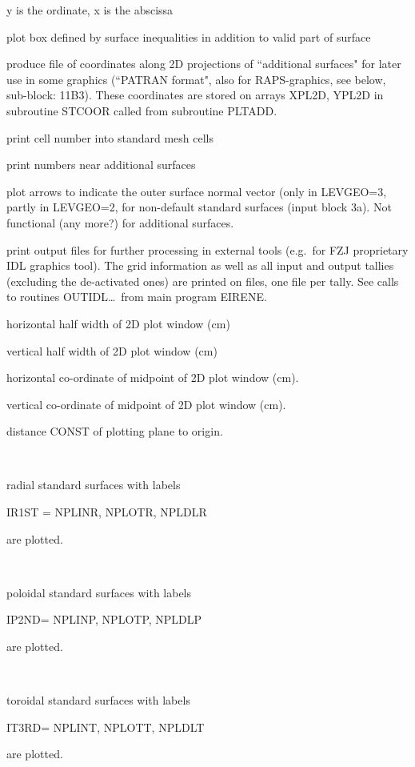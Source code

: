 \begin{description}
\begin{description}
                y is the ordinate, x is the abscissa
        \end{description}
  \item[PLBOX] plot box defined by surface inequalities in addition to valid part
        of surface
  \item[PLSTOR] produce file of coordinates along 2D projections of
        ``additional surfaces" for later use in some graphics (``PATRAN format", also
        for RAPS-graphics, see below, sub-block: 11B3).
        These coordinates are stored on arrays XPL2D, YPL2D in subroutine STCOOR called
        from subroutine PLTADD.
  \item[PLNUMV] print cell number into standard mesh cells
  \item[PLNUMS] print
        numbers near additional surfaces
  \item[PLARR] plot arrows to indicate the outer
        surface normal vector (only in LEVGEO=3, partly in LEVGEO=2, for non-default
        standard surfaces (input block 3a).
        Not functional (any more?) for additional surfaces.
  \item[PLIDL] print output files for further processing in external  tools
        (e.g.\ for FZJ proprietary IDL graphics tool).
        The grid information as well as all input and output tallies (excluding the
        de-activated ones) are printed on files, one file per tally.
        See calls to routines OUTIDL\dots\ from main program EIRENE.
  \item[CH2MX] horizontal half width of 2D plot window (\si{\centi\metre})
  \item[CH2MY] vertical half width of 2D plot window (\si{\centi\metre})
  \item[CH2X0] horizontal co-ordinate of midpoint of 2D plot window
        (\si{\centi\metre}).
  \item[CH2Y0] vertical co-ordinate of midpoint of 2D plot window
        (\si{\centi\metre}).
  \item[CH2Z0] distance CONST of plotting plane to origin.
  \item[NPLINR NPLOTR NPLDLR] ~ 

        radial standard surfaces with labels 

        IR1ST = NPLINR, NPLOTR, NPLDLR 

        are plotted.
  \item[NPLINP NPLOTP NPLDLP] ~ 

        poloidal standard surfaces with labels 

        IP2ND= NPLINP, NPLOTP, NPLDLP 

        are plotted.
  \item[NPLINT NPLOTT NPLDLT] ~ 

        toroidal standard surfaces with labels 

        IT3RD= NPLINT, NPLOTT, NPLDLT 

        are plotted.
\end{description}


